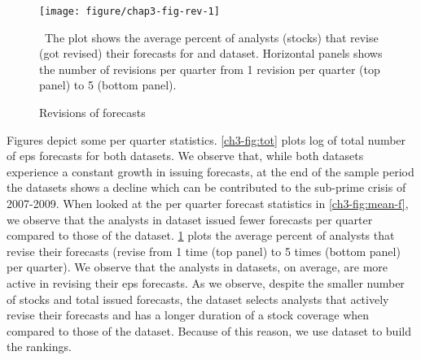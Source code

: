 \documentclass[a4paper,twoside,12pt,openright,notitlepage]{report}\usepackage[]{graphicx}\usepackage[]{color}
\makeatletter
\def\maxwidth{ %
  \ifdim\Gin@nat@width>\linewidth
    \linewidth
  \else
    \Gin@nat@width
  \fi
}
\newenvironment{knitrout}{}{} %
\makeatother
\begin{document}
%
%
%

\begin{figure}
\begin{knitrout}
\color{fgcolor}
\texttt{[image: figure/chap3-fig-rev-1]} 

\end{knitrout}
\caption{Revisions of forecasts}
\ The plot shows the average percent of analysts (stocks) that revise (got revised) their forecasts for \sample{} and \filtered{} dataset. Horizontal panels shows the number of revisions per quarter from 1 revision per quarter (top panel) to 5 (bottom panel).
\label{ch3-fig:rev}
\end{figure}
Figures  depict some per quarter statistics. \ref{ch3-fig:tot} plots log of total number of \gls{eps} forecasts for both datasets. We observe that, while both datasets experience a constant growth in issuing forecasts, at the end of the sample period the \filtered{} datasets shows a decline which can be contributed to the sub-prime crisis of 2007-2009. When looked at the per quarter forecast statistics in \ref{ch3-fig:mean-f}, we observe that the analysts in \filtered{} dataset issued fewer forecasts per quarter compared to those of the \sample{} dataset. \ref{ch3-fig:rev} plots the average percent of analysts that revise their forecasts (revise from 1 time (top panel) to 5 times (bottom panel) per quarter). We observe that the analysts in \filtered{} datasets, on average, are more active in revising their \gls{eps} forecasts. As we observe, despite the smaller number of stocks and total issued forecasts, the \filtered{} dataset selects analysts that actively revise their forecasts and has a longer duration of a stock coverage when compared to those of the \sample{} dataset. Because of this reason, we use \filtered{} dataset to build the rankings.
\end{document}
